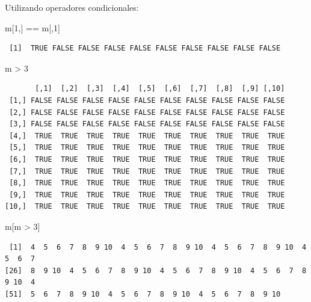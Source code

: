 \documentclass[
  letterpaper,
  DIV=11,
  numbers=noendperiod]{scrartcl}
\newenvironment{Shaded}{\begin{snugshade}}{\end{snugshade}}
\newcommand{\DecValTok}[1]{\textcolor[rgb]{0.68,0.00,0.00}{#1}}
\newcommand{\NormalTok}[1]{\textcolor[rgb]{0.00,0.23,0.31}{#1}}
\newcommand{\SpecialCharTok}[1]{\textcolor[rgb]{0.37,0.37,0.37}{#1}}
\begin{document}
Utilizando operadores condicionales:

\begin{Shaded}
\begin{Highlighting}[]
\NormalTok{m[}\DecValTok{1}\NormalTok{,] }\SpecialCharTok{==}\NormalTok{ m[,}\DecValTok{1}\NormalTok{]  }
\end{Highlighting}
\end{Shaded}

\begin{verbatim}
 [1]  TRUE FALSE FALSE FALSE FALSE FALSE FALSE FALSE FALSE FALSE
\end{verbatim}

\begin{Shaded}
\begin{Highlighting}[]
\NormalTok{m }\SpecialCharTok{\textgreater{}} \DecValTok{3}           
\end{Highlighting}
\end{Shaded}

\begin{verbatim}
       [,1]  [,2]  [,3]  [,4]  [,5]  [,6]  [,7]  [,8]  [,9] [,10]
 [1,] FALSE FALSE FALSE FALSE FALSE FALSE FALSE FALSE FALSE FALSE
 [2,] FALSE FALSE FALSE FALSE FALSE FALSE FALSE FALSE FALSE FALSE
 [3,] FALSE FALSE FALSE FALSE FALSE FALSE FALSE FALSE FALSE FALSE
 [4,]  TRUE  TRUE  TRUE  TRUE  TRUE  TRUE  TRUE  TRUE  TRUE  TRUE
 [5,]  TRUE  TRUE  TRUE  TRUE  TRUE  TRUE  TRUE  TRUE  TRUE  TRUE
 [6,]  TRUE  TRUE  TRUE  TRUE  TRUE  TRUE  TRUE  TRUE  TRUE  TRUE
 [7,]  TRUE  TRUE  TRUE  TRUE  TRUE  TRUE  TRUE  TRUE  TRUE  TRUE
 [8,]  TRUE  TRUE  TRUE  TRUE  TRUE  TRUE  TRUE  TRUE  TRUE  TRUE
 [9,]  TRUE  TRUE  TRUE  TRUE  TRUE  TRUE  TRUE  TRUE  TRUE  TRUE
[10,]  TRUE  TRUE  TRUE  TRUE  TRUE  TRUE  TRUE  TRUE  TRUE  TRUE
\end{verbatim}

\begin{Shaded}
\begin{Highlighting}[]
\NormalTok{m[m }\SpecialCharTok{\textgreater{}} \DecValTok{3}\NormalTok{]   }
\end{Highlighting}
\end{Shaded}

\begin{verbatim}
 [1]  4  5  6  7  8  9 10  4  5  6  7  8  9 10  4  5  6  7  8  9 10  4  5  6  7
[26]  8  9 10  4  5  6  7  8  9 10  4  5  6  7  8  9 10  4  5  6  7  8  9 10  4
[51]  5  6  7  8  9 10  4  5  6  7  8  9 10  4  5  6  7  8  9 10
\end{verbatim}
\end{document}
